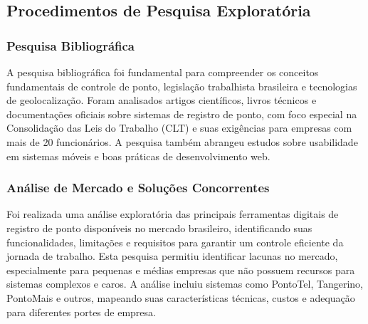 

\subsection{Procedimentos de Pesquisa Exploratória}

\subsubsection{Pesquisa Bibliográfica} 

A pesquisa bibliográfica foi fundamental para compreender os conceitos fundamentais de controle de ponto, legislação trabalhista brasileira e tecnologias de geolocalização. Foram analisados artigos científicos, livros técnicos e documentações oficiais sobre sistemas de registro de ponto, com foco especial na Consolidação das Leis do Trabalho (CLT) e suas exigências para empresas com mais de 20 funcionários. A pesquisa também abrangeu estudos sobre usabilidade em sistemas móveis e boas práticas de desenvolvimento web.

\subsubsection{Análise de Mercado e Soluções Concorrentes}

Foi realizada uma análise exploratória das principais ferramentas digitais de registro de ponto disponíveis no mercado brasileiro, identificando suas funcionalidades, limitações e requisitos para garantir um controle eficiente da jornada de trabalho. Esta pesquisa permitiu identificar lacunas no mercado, especialmente para pequenas e médias empresas que não possuem recursos para sistemas complexos e caros. A análise incluiu sistemas como PontoTel, Tangerino, PontoMais e outros, mapeando suas características técnicas, custos e adequação para diferentes portes de empresa.

